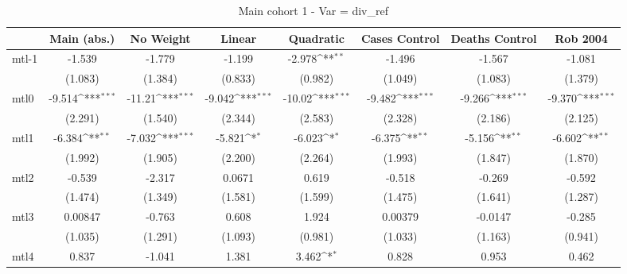 \documentclass{article}
\begin{document}
{
\def\sym#1{\ifmmode^{#1}\else\(^{#1}\)\fi}
\begin{longtable}{l*{7}{c}}
\caption{Main cohort 1 - Var = div\_ref}\\
\hline\hline\endfirsthead\hline\endhead\hline\endfoot\endlastfoot
                &\multicolumn{1}{c}{Main (abs.)}&\multicolumn{1}{c}{No Weight}&\multicolumn{1}{c}{Linear}&\multicolumn{1}{c}{Quadratic}&\multicolumn{1}{c}{Cases Control}&\multicolumn{1}{c}{Deaths Control}&\multicolumn{1}{c}{Rob 2004}\\
\hline
mtl-1           &   -1.539         &   -1.779         &   -1.199         &   -2.978\sym{**} &   -1.496         &   -1.567         &   -1.081         \\
                &  (1.083)         &  (1.384)         &  (0.833)         &  (0.982)         &  (1.049)         &  (1.083)         &  (1.379)         \\
mtl0            &   -9.514\sym{***}&   -11.21\sym{***}&   -9.042\sym{***}&   -10.02\sym{***}&   -9.482\sym{***}&   -9.266\sym{***}&   -9.370\sym{***}\\
                &  (2.291)         &  (1.540)         &  (2.344)         &  (2.583)         &  (2.328)         &  (2.186)         &  (2.125)         \\
mtl1            &   -6.384\sym{**} &   -7.032\sym{***}&   -5.821\sym{*}  &   -6.023\sym{*}  &   -6.375\sym{**} &   -5.156\sym{**} &   -6.602\sym{**} \\
                &  (1.992)         &  (1.905)         &  (2.200)         &  (2.264)         &  (1.993)         &  (1.847)         &  (1.870)         \\
mtl2            &   -0.539         &   -2.317         &   0.0671         &    0.619         &   -0.518         &   -0.269         &   -0.592         \\
                &  (1.474)         &  (1.349)         &  (1.581)         &  (1.599)         &  (1.475)         &  (1.641)         &  (1.287)         \\
mtl3            &  0.00847         &   -0.763         &    0.608         &    1.924         &  0.00379         &  -0.0147         &   -0.285         \\
                &  (1.035)         &  (1.291)         &  (1.093)         &  (0.981)         &  (1.033)         &  (1.163)         &  (0.941)         \\
mtl4            &    0.837         &   -1.041         &    1.381         &    3.462\sym{*}  &    0.828         &    0.953         &    0.462         \\

\end{longtable}}
\end{document}
